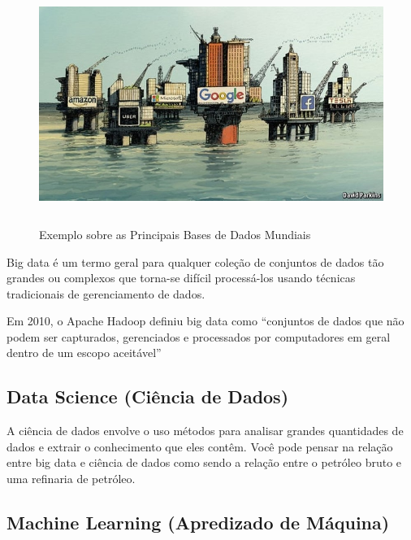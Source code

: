 \vspace{-1.9cm}
\begin{figure}[H]
\centering
\includegraphics[scale=0.5,height=220pt,width=15cm]{figures/dados1.jpeg}
\caption{Exemplo sobre as Principais Bases de Dados Mundiais}
\label{fig:my_label8}
\end{figure}

Big data é um termo geral para qualquer coleção de conjuntos de dados tão grandes ou complexos que torna-se difícil processá-los usando técnicas tradicionais de gerenciamento de dados.\vskip0.3cm

Em 2010, o Apache Hadoop definiu big data como “conjuntos de dados que não podem ser capturados, gerenciados e processados por computadores em geral dentro de um escopo aceitável”





\subsection{Data Science (Ciência de Dados)}

A ciência de dados envolve o uso
métodos para analisar grandes quantidades de dados e extrair o conhecimento que eles contêm.
Você pode pensar na relação entre big data e ciência de dados como sendo
a relação entre o petróleo bruto e uma refinaria de petróleo. 








\subsection{Machine Learning (Apredizado de Máquina)}


